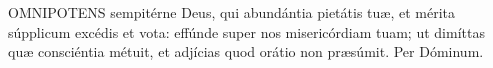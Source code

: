 




\lettrine[lines=2]{O}{MNIPOTENS} sempitérne Deus, qui abundántia pietátis tuæ, et mérita súpplicum excédis et vota: effúnde super nos misericórdiam tuam; ut dimíttas quæ consciéntia métuit, et adjícias quod orátio non præsúmit. Per Dóminum.



